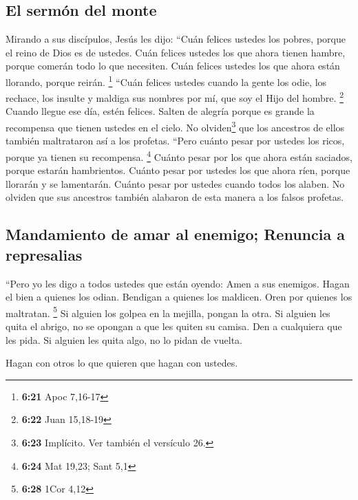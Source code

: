 \hypertarget{el-sermuxf3n-del-monte}{%
\subsection{El sermón del monte}\label{el-sermuxf3n-del-monte}}

 Mirando a sus discípulos, Jesús les dijo:
 ``Cuán felices ustedes los pobres, porque el reino de
Dios es de ustedes. Cuán felices ustedes los que ahora tienen hambre,
porque comerán todo lo que necesiten. Cuán felices ustedes los que ahora
están llorando, porque reirán. \footnote{\textbf{6:21} Apoc 7,16-17}
 ``Cuán felices ustedes cuando la gente los odie, los
rechace, los insulte y maldiga sus nombres por mí, que soy el Hijo del
hombre. \footnote{\textbf{6:22} Juan 15,18-19}  Cuando
llegue ese día, estén felices. Salten de alegría porque es grande la
recompensa que tienen ustedes en el cielo. No olviden\footnote{\textbf{6:23}
  Implícito. Ver también el versículo 26.} que los ancestros de ellos
también maltrataron así a los profetas.  ``Pero cuánto
pesar por ustedes los ricos, porque ya tienen su recompensa. \footnote{\textbf{6:24}
  Mat 19,23; Sant 5,1}  Cuánto pesar por los que ahora
están saciados, porque estarán hambrientos. Cuánto pesar por ustedes los
que ahora ríen, porque llorarán y se lamentarán.  Cuánto
pesar por ustedes cuando todos los alaben. No olviden que sus ancestros
también alabaron de esta manera a los falsos profetas.

\hypertarget{mandamiento-de-amar-al-enemigo-renuncia-a-represalias}{%
\subsection{Mandamiento de amar al enemigo; Renuncia a
represalias}\label{mandamiento-de-amar-al-enemigo-renuncia-a-represalias}}

 ``Pero yo les digo a todos ustedes que están oyendo:
Amen a sus enemigos. Hagan el bien a quienes los odian. 
Bendigan a quienes los maldicen. Oren por quienes los maltratan.
\footnote{\textbf{6:28} 1Cor 4,12}  Si alguien los golpea
en la mejilla, pongan la otra. Si alguien les quita el abrigo, no se
opongan a que les quiten su camisa.  Den a cualquiera que
les pida. Si alguien les quita algo, no lo pidan de vuelta.

 Hagan con otros lo que quieren que hagan con ustedes.

